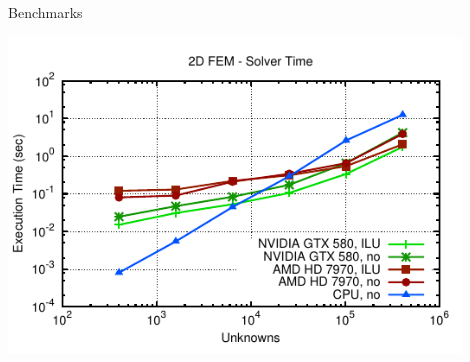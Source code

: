 \begin{frame}{Benchmarks}
  \begin{center}
   \includegraphics[width=0.90\textwidth]{figures/fem2d-solver-coloring.pdf}
  \end{center}
\end{frame}


